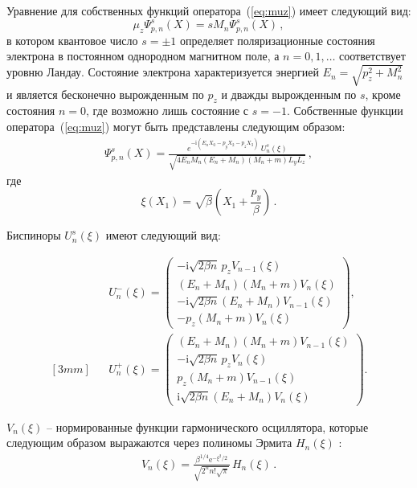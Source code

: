 \documentclass[cp1251%
               ]{jetp} %
\def\beq{\begin{eqnarray}}
\def\eeq{\end{eqnarray}}
\newcommand{\ii}{\mathrm{i}} %
\newcommand{\eee}{\mathrm{e}} %
\begin{document}
Уравнение для собственных функций оператора~(\ref{eq:muz}) имеет следующий вид:
\begin{equation}
	{\mu}_z \Psi^s_{p,n}(X)=s M_n \Psi^s_{p,n}(X)\, ,
\end{equation}
в котором квантовое число $s=\pm 1$ определяет поляризационные состояния электрона в постоянном однородном магнитном поле, а $n=0,1,\dots$ соответствует уровню Ландау. 
Состояние электрона характеризуется энергией $E_n = \sqrt{p_z^2+M_n^2}$ и является бесконечно вырожденным по $p_z$ и дважды вырожденным по $s$, кроме состояния 
$n=0$, где возможно лишь состояние с $s=-1$. Собственные функции оператора~(\ref{eq:muz}) могут быть представлены следующим образом:
\begin{eqnarray}
\label{eq:psie}
\Psi^s_{p,n}(X) = \frac{e^{-\ii(E_{n} X_0 - p_y X_2 - p_z X_3)}\; U^s_{n} (\xi)}
{\sqrt{4E_{n}M_n (E_{n} + M_n)(M_n + m) L_y L_z}} \, ,  
\end{eqnarray}
где 
\begin{equation}
	\xi(X_1)=\sqrt{\beta}\left(X_1+ \frac{p_y}{\beta}\right)\, .
\end{equation}

Биспиноры  $U^s_{n} (\xi)$ имеют следующий вид:

\beq
\label{eq:U--}
&&U^{-}_{n} (\xi) = \left ( 
\begin{array}{c}
	-\ii\sqrt{2\beta n} \, p_z V_{n-1} (\xi)\\[2mm]
	(E_n + M_n)(M_n + m) V_n (\xi)\\[2mm]
	-\ii\sqrt{2\beta n} (E_n + M_n) V_{n-1} (\xi)\\[2mm]
	-p_z (M_n + m) V_n (\xi)
\end{array}
\right )  ,   
%
\\ [3mm]
\label{eq:U+-}
&&U^{+}_{n} (\xi) = \left ( 
\begin{array}{c}
	(E_n + M_n) (M_n + m) V_{n-1} (\xi)\\[2mm]
	-\ii\sqrt{2\beta n} \, p_z V_n (\xi)\\[2mm]
	p_z (M_n + m) V_{n-1} (\xi)\\[2mm]
	\ii \sqrt{2 \beta n} (E_n + M_n) V_n (\xi)
\end{array}
\right )\! .
\eeq

$V_n(\xi)$ -- нормированные функции гармонического осциллятора, которые 
следующим образом выражаются через полиномы Эрмита $H_n(\xi)$ \cite{Gradstein:1963}:
%
\begin{eqnarray}
\label{eq:V_n}
V_n (\xi) = \frac{\beta^{1/4}\eee^{-\xi^2/2}}{\sqrt{2^n n! \sqrt{\pi}}} \, H_n(\xi)\, .
\end{eqnarray}
\end{document}
